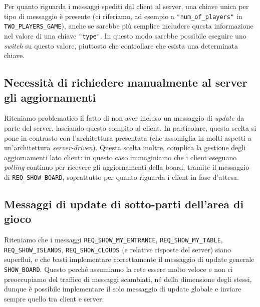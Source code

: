 \documentclass{article}
\begin{document}
            Per quanto riguarda i messaggi spediti dal client al server, una chiave
            unica per tipo di messaggio è presente (ci riferiamo, ad esempio a
            \texttt{"num\_of\_players"} in \texttt{TWO\_PLAYERS\_GAME}), anche se
            sarebbe più semplice includere questa informazione nel valore di una chiave
            \texttt{"type"}. In questo modo sarebbe possibile eseguire uno \textit{switch}
            su questo valore, piuttosto che controllare che esista una determinata chiave.

        \subsection{Necessità di richiedere manualmente al server gli aggiornamenti}
            Riteniamo problematico il fatto di non aver incluso un messaggio di
            \textit{update} da parte del server, lasciando questo compito al client.
            In particolare, questa scelta si pone in contrasto con l'architettura presentata
            (che assomiglia in molti aspetti a un'architettura \textit{server-driven}).
            Questa scelta inoltre, complica la gestione degli aggiornamenti lato client:
            in questo caso immaginiamo che i client eseguano \textit{polling} continuo per
            ricevere gli aggiornamenti della board, tramite il messaggio di 
            \texttt{REQ\_SHOW\_BOARD}, soprattutto per quanto riguarda i client in fase
            d'attesa.

        \subsection{Messaggi di update di sotto-parti dell'area di gioco}
            Riteniamo che i messaggi \texttt{REQ\_SHOW\_MY\_ENTRANCE}, \texttt{REQ\_SHOW\_MY\_TABLE},\\
            \texttt{REQ\_SHOW\_ISLANDS}, \texttt{REQ\_SHOW\_CLOUDS} (e relative risposte del server)
            siano superflui, e che basti implementare correttamente il messaggio di update generale
            \texttt{SHOW\_BOARD}. Questo perché assumiamo la rete essere molto veloce e non
            ci preoccupiamo del traffico di messaggi scambiati, né della dimensione degli stessi,
            dunque è possibile implementare il solo messaggio di update globale e inviare sempre 
            quello tra client e server.
\end{document}
